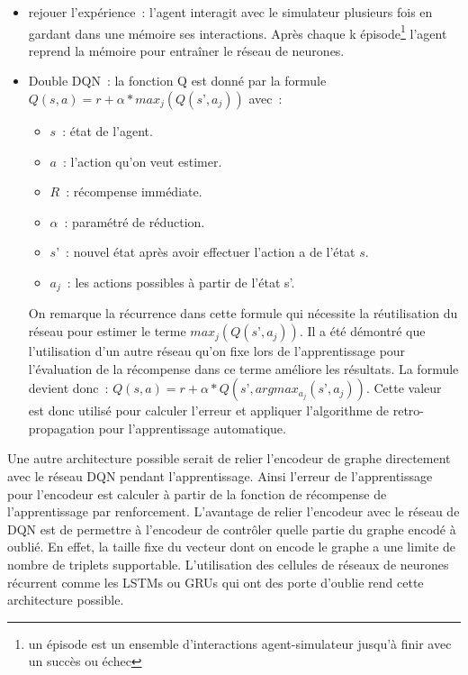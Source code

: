 \begin{itemize}
	\item rejouer l’expérience : l’agent interagit avec le simulateur plusieurs fois en gardant dans une mémoire ses interactions. Après chaque k épisode\footnote{un épisode est un ensemble d’interactions agent-simulateur jusqu’à finir avec un succès ou échec} l’agent reprend la mémoire pour entraîner le réseau de neurones.
	\item Double DQN : la fonction Q est donné par la formule $Q(s,a) = r + \alpha*max_j(Q(s’,a_j))$ avec :
	\begin{itemize}
		\item $s$ : état de l’agent.
		\item $a$ : l’action qu’on veut estimer.
		\item $R$ : récompense immédiate.
		\item $\alpha$ : paramétré de réduction.
		\item $s’$ : nouvel état après avoir effectuer l’action a de l’état $s$.
		\item $a_j$ : les actions possibles à partir de l’état s’.
	\end{itemize}
On remarque la récurrence dans cette formule qui nécessite la réutilisation du réseau pour estimer le terme $max_j (Q(s’,a_j))$. Il a été démontré que l’utilisation d’un autre réseau qu’on fixe lors de l’apprentissage pour l’évaluation de la récompense dans ce terme améliore les résultats\cite{Mnih2015}. La formule devient donc : $Q(s,a) = r + \alpha*Q(s’,argmax_{a_j}(s’,a_j))$. Cette valeur est donc utilisé pour calculer l’erreur et appliquer l’algorithme de retro-propagation pour l’apprentissage automatique.
\end{itemize}
Une autre architecture possible serait de relier l’encodeur de graphe directement avec le réseau DQN pendant l’apprentissage. Ainsi l’erreur de l’apprentissage pour l’encodeur est calculer à partir de la fonction de récompense de l’apprentissage par renforcement. L’avantage de relier l’encodeur avec le réseau de DQN est de permettre à l’encodeur de contrôler quelle partie du graphe encodé à oublié. En effet, la taille fixe du vecteur dont on encode le graphe a une limite de nombre de triplets supportable. L’utilisation des cellules de réseaux de neurones récurrent comme les LSTMs ou GRUs qui ont des porte d’oublie rend cette architecture possible.
